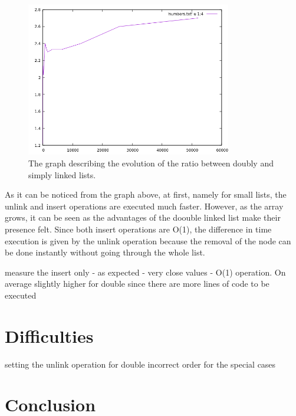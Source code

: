 \documentclass[a4paper,11pt]{article}
\begin{document}
\begin{figure}[ht]
    \centering
    \includegraphics[width=0.8\textwidth]{doubly_simply_ratio.png}
    \caption{The graph describing the evolution of the ratio between doubly and simply linked lists.}
    \label{fig:1}
\end{figure}

As it can be noticed from the graph above, at first, namely for small lists, the unlink and insert operations are executed much faster. However, as the 
array grows, it can be seen as the advantages of the doouble linked list make their presence felt. Since both insert operations are O(1), 
the difference in time execution is given by the unlink operation because the removal of the node can be done instantly without going through the whole list. 

measure the insert only - as expected - very close values - O(1) operation. On average slightly higher for double since there are more lines of code to be executed 

\section*{Difficulties} 

setting the unlink operation for double 
incorrect order for the special cases 

\section*{Conclusion}
\end{document}

